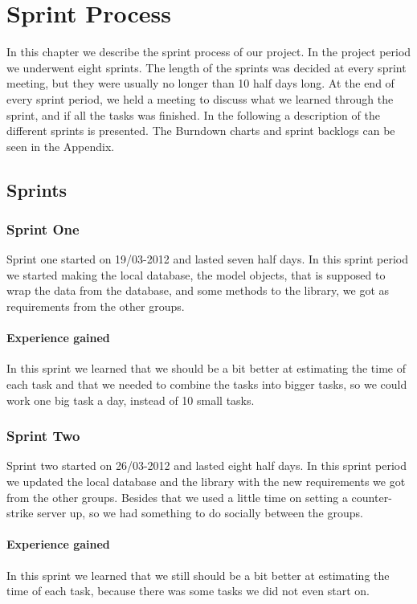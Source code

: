\chapter{Sprint Process}
\label{ch:SprintProcess}
In this chapter we describe the sprint process of our project. In the project period we underwent eight sprints. The length of the sprints was decided at every sprint meeting, but they were usually no longer than 10 half days long. At the end of every sprint period, we held a meeting to discuss what we learned through the sprint, and if all the tasks was finished. In the following a description of the different sprints is presented. The Burndown charts and sprint backlogs can be seen in the Appendix.

\section{Sprints}
\subsection{Sprint One}
Sprint one started on 19/03-2012 and lasted seven half days. In this sprint period we started making the local database, the model objects, that is supposed to wrap the data from the database, and some methods to the library, we got as requirements from the other groups.

\subsubsection{Experience gained}
In this sprint we learned that we should be a bit better at estimating the time of each task and that we needed to combine the tasks into bigger tasks, so we could work one big task a day, instead of 10 small tasks.

\subsection{Sprint Two}
Sprint two started on 26/03-2012 and lasted eight half days. In this sprint period we updated the local database and the library with the new requirements we got from the other groups. Besides that we used a little time on setting a counter-strike server up, so we had something to do socially between the groups.

\subsubsection{Experience gained}
In this sprint we learned that we still should be a bit better at estimating the time of each task, because there was some tasks we did not even start on.

